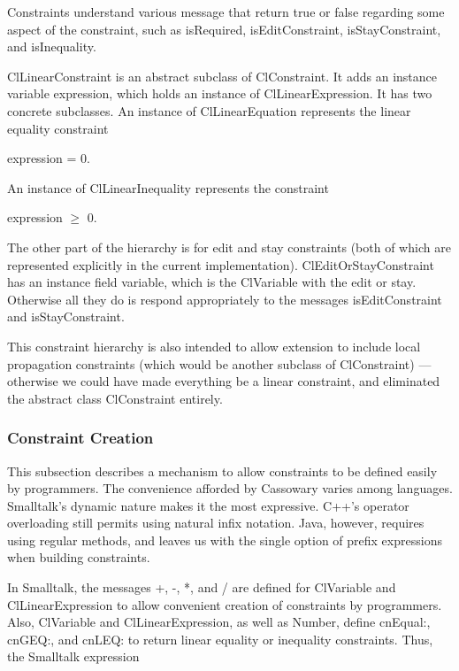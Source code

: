 \documentclass{article}
\begin{document}
Constraints understand various message that return true or false regarding
some aspect of the constraint, such as {\sf isRequired}, {\sf
isEditConstraint}, {\sf isStayConstraint}, and {\sf isInequality}.

{\sf ClLinearConstraint} is an abstract subclass of {\sf ClConstraint}.  It
adds an instance variable {\sf expression}, which holds an instance of
{\sf ClLinearExpression}.  It has two concrete subclasses.  An instance of
{\sf ClLinearEquation} represents the linear equality constraint

\hspace*{1cm} {\sf expression = 0}.

An instance of {\sf  ClLinearInequality} represents
the constraint

\hspace*{1cm} {\sf expression} $\geq$ 0.

The other part of the hierarchy is for edit and stay constraints (both of
which are represented explicitly in the current implementation).  {\sf
ClEditOrStayConstraint} has an instance field {\sf variable}, which is
the \textsf{ClVariable} with the edit or stay.  Otherwise all they do is respond
appropriately to the messages {\sf isEditConstraint} and {\sf
isStayConstraint}. 

This constraint hierarchy is also intended to allow extension to include
local propagation constraints (which would be another subclass of {\sf
  ClConstraint}) --- otherwise we could have made everything be a linear
constraint, and eliminated the abstract class {\sf ClConstraint}
entirely.

\subsubsection{Constraint Creation}
\label{constraint-creation}

This subsection describes a mechanism to allow constraints to be defined
easily by programmers.  The convenience afforded by Cassowary varies
among languages.  Smalltalk's dynamic nature makes it the most
expressive.  C++'s operator overloading still permits using natural
infix notation.  Java, however, requires using regular methods, and
leaves us with the single option of prefix expressions when building
constraints.

In Smalltalk, the messages +, -, *, and / are defined for {\sf
  ClVariable} and {\sf ClLinearExpression} to allow convenient creation
of constraints by programmers.  Also, {\sf ClVariable} and {\sf
  ClLinearExpression}, as well as {\sf Number}, define {\sf cnEqual:},
{\sf cnGEQ:}, and {\sf cnLEQ:} to return linear equality or inequality
constraints.  Thus, the Smalltalk expression
\end{document}
